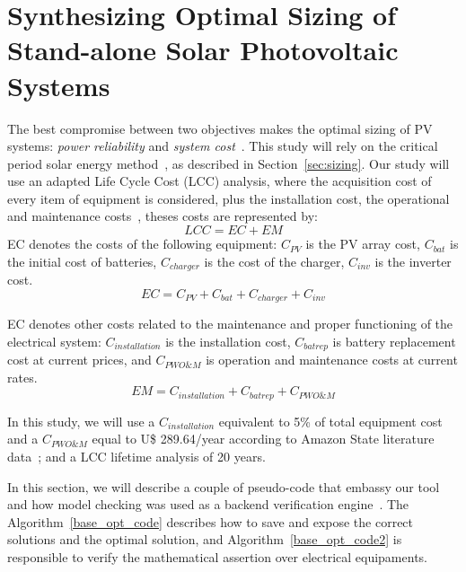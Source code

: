 \documentclass[10pt,journal,compsoc]{IEEEtran}
\begin{document}
\section{Synthesizing Optimal Sizing of Stand-alone Solar Photovoltaic Systems}
\label{sec:SynthesizingOptimalSolarPhotovoltaicSystems}

The best compromise between two objectives makes the optimal sizing of PV systems: \textit{power reliability} and \textit{system cost}~\cite{Alsadi2018}. This study will rely on the critical period solar energy method~\cite{Pinho}, as described in Section~\ref{sec:sizing}. Our study will use an adapted Life Cycle Cost (LCC) analysis, where the acquisition cost of every item of equipment is considered, plus the installation cost, the operational and maintenance costs~\cite{Alsadi2018}, theses costs are represented by:
\begin{equation}
\label{eq:LCC}
LCC = EC + EM
\end{equation}
%
\noindent EC denotes the costs of the following equipment: $C_{PV}$ is the PV array cost, $C_{bat}$ is the initial cost of batteries, $C_{charger}$ is the cost of the charger, $C_{inv}$ is the inverter cost.
\begin{equation}
\label{eq:EquipamentCost}
EC = C_{PV} + C_{bat} + C_{charger} + C_{inv}
\end{equation}

EC denotes other costs related to the maintenance and proper functioning of the electrical system: $C_{installation}$ is the installation cost, $C_{batrep}$ is battery replacement cost at current prices, and $C_{PWO\&M}$ is operation and maintenance costs at current rates.
\begin{equation}
\label{eq:EquipamentMaintenence}
EM = C_{installation} + C_{batrep} + C_{PWO\&M}
\end{equation}

In this study, we will use a $C_{installation}$ equivalent to 5\% of total equipment cost and a $C_{PWO\&M}$ equal to U\$ 289.64/year according to Amazon State literature data~\cite{Agrener2013}; and a LCC lifetime analysis of 20 years.

\color{blue} In this section, we will describe a couple of pseudo-code that embassy our tool and how model checking was used as a backend verification engine~\cite{DBLP:journals/corr/abs-1909-13139}. The Algorithm~\ref{base_opt_code} describes how to save and expose the correct solutions and the optimal solution, and Algorithm~\ref{base_opt_code2} is responsible to verify the mathematical assertion over electrical equipaments.
\end{document}
